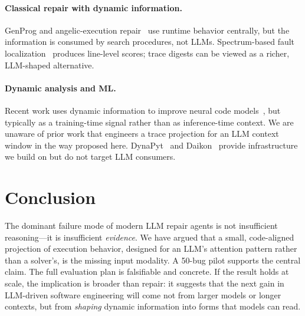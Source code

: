 \documentclass[sigconf,review,anonymous,nonacm]{acmart}
\begin{document}
\paragraph{Classical repair with dynamic information.} GenProg
\cite{legoues2012genprog} and angelic-execution
repair~\cite{chandra2011angelic} use runtime behavior centrally, but the
information is consumed by search procedures, not LLMs. Spectrum-based
fault localization~\cite{wong2016survey} produces line-level scores; trace
digests can be viewed as a richer, LLM-shaped alternative.

\paragraph{Dynamic analysis and ML.} Recent work uses dynamic information
to improve neural code models~\cite{nie2023crossfile,wei2023copiloting},
but typically as a training-time signal rather than as inference-time
context. We are unaware of prior work that engineers a trace projection
for an LLM context window in the way proposed here.
DynaPyt~\cite{eghbali2022dynapyt} and Daikon~\cite{ernst2007daikon}
provide infrastructure we build on but do not target LLM consumers.

\section{Conclusion}
\label{sec:conclusion}

The dominant failure mode of modern LLM repair agents is not insufficient
reasoning---it is insufficient \emph{evidence}. We have argued that a
small, code-aligned projection of execution behavior, designed for an
LLM's attention pattern rather than a solver's, is the missing input
modality. A 50-bug pilot supports the central claim. The full evaluation
plan is falsifiable and concrete. If the result holds at scale, the
implication is broader than repair: it suggests that the next gain in
LLM-driven software engineering will come not from larger models or
longer contexts, but from \emph{shaping} dynamic information into forms
that models can read.

\balance



\end{document}
